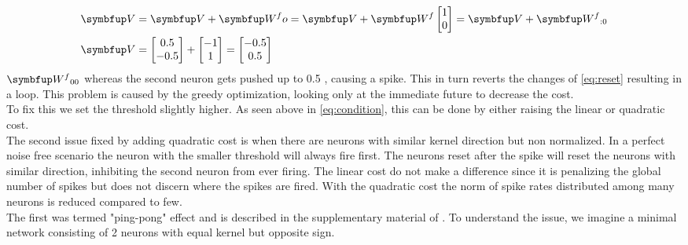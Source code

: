 \begin{equation}\label{eq:reset}
\begin{aligned}
\bmu{V} &= \bmu{V} + \bmu{W^fo} = \bmu{V} + \bmu{W^f}\begin{bmatrix}
1\\
0
\end{bmatrix} = \bmu{V} + \bmu{W^f}_{:0}\\
\bmu{V} &= \begin{bmatrix}
0.5\\
-0.5\\
\end{bmatrix} +
\begin{bmatrix}
-1\\
1\\
\end{bmatrix} =
\begin{bmatrix}
-0.5\\
0.5
\end{bmatrix}
\end{aligned}
\end{equation}
$\bmu{W^f}_{00}$ whereas the second neuron gets pushed up to 0.5 , causing a spike. This in turn reverts the changes of \cref{eq:reset} resulting in a loop. This problem is caused by the greedy optimization, looking only at the immediate future to decrease the cost.\\
To fix this we set the threshold slightly higher. As seen above in \cref{eq:condition}, this can be done by either raising the linear or quadratic cost.\\
The second issue fixed by adding quadratic cost is when there are
neurons with similar kernel direction but non normalized. In a perfect noise free scenario the neuron with the smaller threshold will always fire first. The neurons reset after the spike will reset the neurons with similar direction, inhibiting the second neuron from ever firing. The linear cost do not make a difference since it is penalizing the global number of spikes but does not discern where the spikes are fired. With the quadratic cost the norm of spike rates distributed among many neurons is reduced compared to few.\\

The first was termed "ping-pong" effect and is described in the supplementary material of \cite{boerlin_predictive_2013}. To understand the issue, we imagine a minimal network consisting of 2 neurons with equal kernel but opposite sign.\\ 

